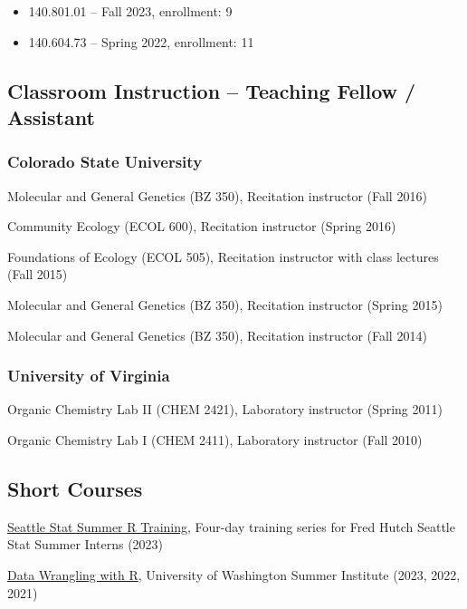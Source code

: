 \documentclass{cv}
\begin{document}
\begin{itemize}

\item 140.801.01 -- Fall 2023, enrollment: 9

\item 140.604.73 -- Spring 2022, enrollment: 11

\end{itemize}

\subsection*{Classroom Instruction -- Teaching Fellow / Assistant}

\subsubsection*{Colorado State University}

Molecular and General Genetics (BZ 350), Recitation instructor (Fall 2016)

Community Ecology (ECOL 600), Recitation instructor (Spring 2016)

Foundations of Ecology (ECOL 505), Recitation instructor with class lectures (Fall 2015)

Molecular and General Genetics (BZ 350), Recitation instructor (Spring 2015)

Molecular and General Genetics (BZ 350), Recitation instructor (Fall 2014)

\subsubsection*{University of Virginia}

Organic Chemistry Lab II (CHEM 2421), Laboratory instructor (Spring 2011)

Organic Chemistry Lab I (CHEM 2411), Laboratory instructor (Fall 2010)

\subsection*{Short Courses}

\href{https://hutchdatascience.org/SeattleStatSummer_R}{Seattle Stat Summer R Training}, Four-day training series for Fred Hutch Seattle Stat Summer Interns (2023)

\href{http://sisbid.github.io/Data-Wrangling/}{Data Wrangling with R}, University of Washington Summer Institute (2023, 2022, 2021)
\end{document}
